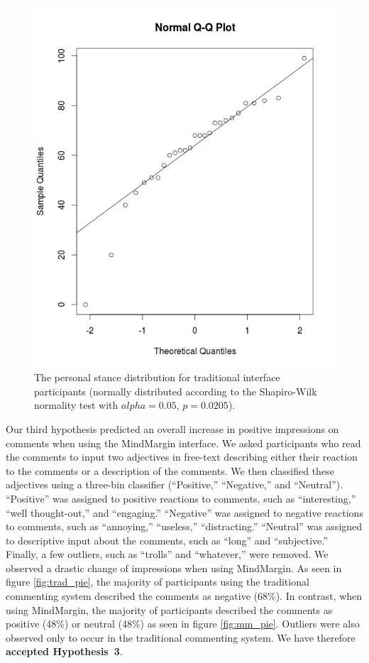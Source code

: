 \begin{figure}[h]
\centering
\includegraphics[scale=0.25]{regular_normal.png}
\caption{The personal stance distribution for traditional interface participants (normally distributed according to the Shapiro-Wilk normality test with $alpha=0.05$, $p=0.0205$).}
\label{fig:reg_normal}
\end{figure}

Our third hypothesis predicted an overall increase in positive impressions on comments when using the MindMargin interface. We asked participants who read the comments to input two adjectives in free-text describing either their reaction to the comments or a description of the comments. We then classified these adjectives using a three-bin classifier (“Positive,” “Negative,” and “Neutral”). “Positive” was assigned to positive reactions to comments, such as “interesting,” “well thought-out,” and “engaging.” “Negative” was assigned to negative reactions to comments, such as “annoying,” “useless,” “distracting.” “Neutral” was assigned to descriptive input about the comments, such as “long” and “subjective.” Finally, a few outliers, such as “trolls” and “whatever,” were removed. We observed a drastic change of impressions when using MindMargin. As seen in figure \ref{fig:trad_pie}, the majority of participants using the traditional commenting system described the comments as negative (68\%). In contrast, when using MindMargin, the majority of participants described the comments as positive (48\%) or neutral (48\%) as seen in figure \ref{fig:mm_pie}.  Outliers were also observed only to occur in the traditional commenting system. We have therefore \textbf{accepted Hypothesis~3}. 

